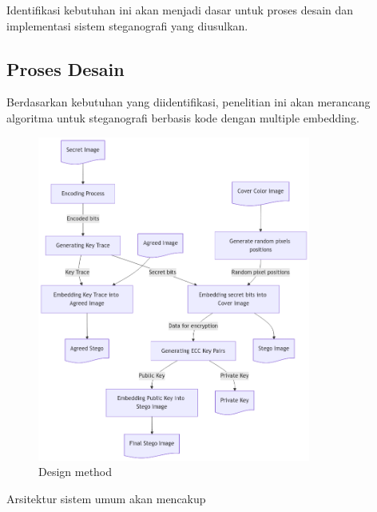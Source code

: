\documentclass{ittelkom}
\begin{document}
Identifikasi kebutuhan ini akan menjadi dasar untuk proses desain dan
implementasi sistem steganografi yang diusulkan.

\subsection{Proses Desain}
Berdasarkan kebutuhan yang diidentifikasi, penelitian ini akan merancang
algoritma untuk steganografi berbasis kode dengan multiple embedding.

\begin{figure}[h]
    \centering
    \includegraphics[width=0.8\textwidth]{gambar/proposed.png}
    \caption{Design method}
    \label{fig:flow}
\end{figure}


Arsitektur sistem umum akan mencakup
\end{document}

